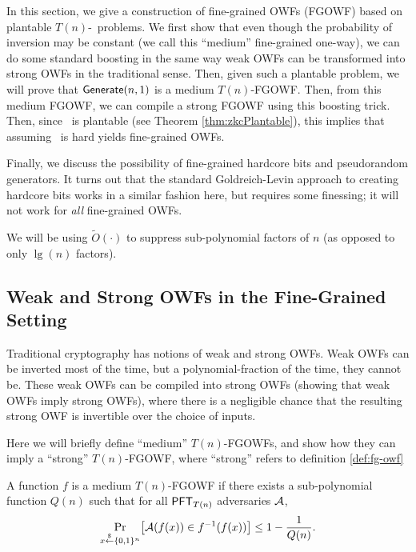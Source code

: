 

In this section, we give a construction of fine-grained OWFs (FGOWF) based on plantable $T(n)$-\ACIH~problems. We first show that even though the probability of inversion may be constant (we call this ``medium'' fine-grained one-way), we can do some standard boosting in the same way weak OWFs can be transformed into strong OWFs in the traditional sense. Then, given such a plantable problem, we will prove that $\mathsf{Generate}(n,1)$ is a medium $T(n)$-FGOWF. Then, from this medium FGOWF, we can compile a strong FGOWF using this boosting trick. Then, since \zkclique~is plantable (see Theorem \ref{thm:zkcPlantable}), this implies that assuming \zkclique~is hard yields fine-grained OWFs.

Finally, we discuss the possibility of fine-grained hardcore bits and pseudorandom generators. It turns out that the standard Goldreich-Levin \cite{hardCoreBitsAndXorLemmaFromGL} approach to creating hardcore bits works in a similar fashion here, but requires some finessing; it will not work for \emph{all} fine-grained OWFs.

We will be using $\tilde{O}(\cdot)$ to suppress sub-polynomial factors of $n$ (as opposed to only $\lg(n)$ factors). 

\subsection{Weak and Strong OWFs in the Fine-Grained Setting}

Traditional cryptography has notions of weak and strong OWFs. Weak OWFs can be inverted most of the time, but a polynomial-fraction of the time, they cannot be. These weak OWFs can be compiled into strong OWFs (showing that weak OWFs imply strong OWFs), where there is a negligible chance that the resulting strong OWF is invertible over the choice of inputs.

Here we will briefly define ``medium'' $T(n)$-FGOWFs, and show how they can imply a ``strong'' $T(n)$-FGOWF, where ``strong'' refers to definition \ref{def:fg-owf}

\begin{definition}
	A function $f$ is a medium $T(n)$-FGOWF if there exists a sub-polynomial function $Q(n)$ such that for all $\mathsf{PFT}_{T(n)}$ adversaries $\mathcal{A}$,
	\[ \Pr_{x \stackrel{\scriptscriptstyle{\$}}{\gets} \{0,1\}^n}\bigl[ \mathcal{A}(f(x)) \in f^{-1}(f(x)) \bigr] \le 1 - \frac 1 {Q(n)}. \]
\end{definition}

